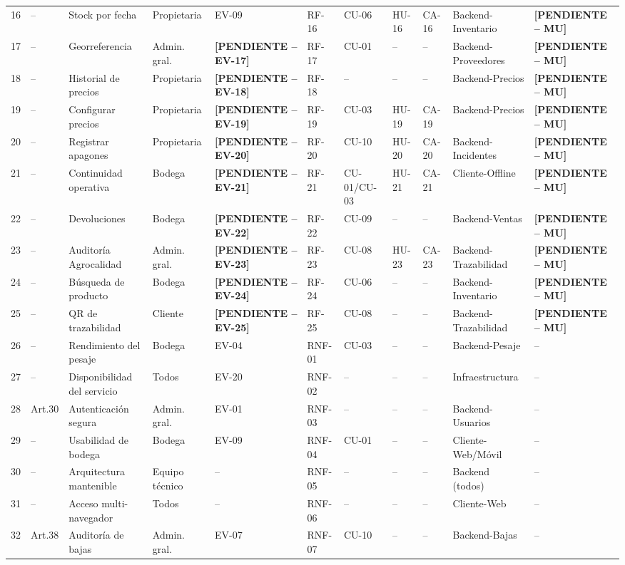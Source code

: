 \documentclass[11pt,a4paper]{article}
\newcommand{\PENDIENTE}[1]{\textcolor{pendiente}{\textbf{[PENDIENTE -- #1]}}}
\begin{document}
\begin{longtable}{|p{0.6cm}|p{1.6cm}|p{2.3cm}|p{1.7cm}|p{0.9cm}|p{0.9cm}|p{0.9cm}|p{0.9cm}|p{0.9cm}|p{1.5cm}|p{1.1cm}|}
16 & -- & Stock por fecha & Propietaria & EV-09 & RF-16 & CU-06 & HU-16 & CA-16 & Backend-Inventario & \PENDIENTE{MU} \\
17 & -- & Georreferencia & Admin. gral. & \PENDIENTE{EV-17} & RF-17 & CU-01 & -- & -- & Backend-Proveedores & \PENDIENTE{MU} \\
18 & -- & Historial de precios & Propietaria & \PENDIENTE{EV-18} & RF-18 & -- & -- & -- & Backend-Precios & \PENDIENTE{MU} \\
19 & -- & Configurar precios & Propietaria & \PENDIENTE{EV-19} & RF-19 & CU-03 & HU-19 & CA-19 & Backend-Precios & \PENDIENTE{MU} \\
20 & -- & Registrar apagones & Propietaria & \PENDIENTE{EV-20} & RF-20 & CU-10 & HU-20 & CA-20 & Backend-Incidentes & \PENDIENTE{MU} \\
21 & -- & Continuidad operativa & Bodega & \PENDIENTE{EV-21} & RF-21 & CU-01/CU-03 & HU-21 & CA-21 & Cliente-Offline & \PENDIENTE{MU} \\
22 & -- & Devoluciones & Bodega & \PENDIENTE{EV-22} & RF-22 & CU-09 & -- & -- & Backend-Ventas & \PENDIENTE{MU} \\
23 & -- & Auditoría Agrocalidad & Admin. gral. & \PENDIENTE{EV-23} & RF-23 & CU-08 & HU-23 & CA-23 & Backend-Trazabilidad & \PENDIENTE{MU} \\
24 & -- & Búsqueda de producto & Bodega & \PENDIENTE{EV-24} & RF-24 & CU-06 & -- & -- & Backend-Inventario & \PENDIENTE{MU} \\
25 & -- & QR de trazabilidad & Cliente & \PENDIENTE{EV-25} & RF-25 & CU-08 & -- & -- & Backend-Trazabilidad & \PENDIENTE{MU} \\
26 & -- & Rendimiento del pesaje & Bodega & EV-04 & RNF-01 & CU-03 & -- & -- & Backend-Pesaje & -- \\
27 & -- & Disponibilidad del servicio & Todos & EV-20 & RNF-02 & -- & -- & -- & Infraestructura & -- \\
28 & Art.30 & Autenticación segura & Admin. gral. & EV-01 & RNF-03 & -- & -- & -- & Backend-Usuarios & -- \\
29 & -- & Usabilidad de bodega & Bodega & EV-09 & RNF-04 & CU-01 & -- & -- & Cliente-Web/Móvil & -- \\
30 & -- & Arquitectura mantenible & Equipo técnico & -- & RNF-05 & -- & -- & -- & Backend (todos) & -- \\
31 & -- & Acceso multi-navegador & Todos & -- & RNF-06 & -- & -- & -- & Cliente-Web & -- \\
32 & Art.38 & Auditoría de bajas & Admin. gral. & EV-07 & RNF-07 & CU-10 & -- & -- & Backend-Bajas & -- \\

\end{longtable}
\end{document}
